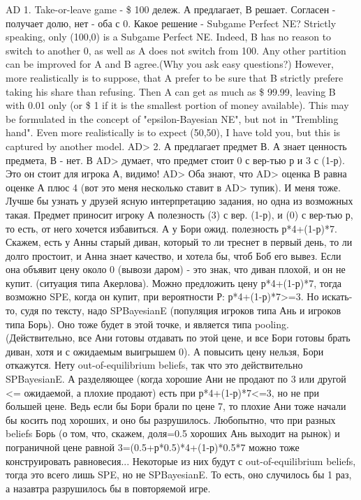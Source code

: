\documentclass[a4paper,12pt]{article}
\begin{document}
AD 1. Take-or-leave game - \$ 100 дележ. А предлагает, В
решает. Согласен -   получает долю, нет - оба с 0. Какое
решение - Subgame Perfect NE? Strictly speaking, only
(100,0) is a Subgame Perfect NE. Indeed, B has no reason to
switch to another 0, as well as A does not switch from 100.
Any other partition can be improved for A and B agree.(Why
you ask easy questions?) However, more realistically is to
suppose, that A prefer to be sure that B strictly prefere
taking his share than refusing. Then A can get as much as
\$ 99.99, leaving B with 0.01 only (or \$ 1 if it is the
smallest portion of money available). This may be
formulated in the concept of "epsilon-Bayesian NE", but not
in "Trembling hand". Even more realistically is to expect
(50,50), I have told you, but this is captured by another
model. AD> 2. А предлагает предмет В. А знает ценность
предмета, В - нет. В AD> думает, что предмет стоит 0 с
вер-тью р и 3 с (1-р). Это он стоит для игрока А, видимо!
AD> Оба знают, что AD> оценка В равна оценке А плюс 4 (вот
это меня несколько ставит в AD> тупик). И меня тоже. Лучше
бы узнать у друзей ясную интерпретацию задания, но одна из
возможных такая. Предмет приносит игроку А полезность (3) с
вер. (1-р),  и (0) с вер-тью р, то есть, от него хочется
избавиться. А у Бори ожид. полезность р*4+(1-р)*7.
 Скажем, есть у Анны старый диван, который то ли треснет в
первый день, то ли долго простоит, и Анна знает качество, и хотела бы,
чтоб Боб его вывез. Если она объявит цену около 0 (вывози даром) - это знак,
что диван плохой, и он не купит. (ситуация типа Акерлова).
Можно предложить цену р*4+(1-р)*7, тогда возможно SPE, когда он купит,
при вероятности Р:  р*4+(1-р)*7>=3.
Но искать-то, судя по тексту, надо SPBayesianE (популяция
игроков типа Ань и игроков типа Борь). Оно тоже будет в
этой точке, и является типа pooling.(Действительно, все Ани готовы
отдавать по этой цене, и все Бори готовы брать диван,
хотя и с ожидаемым выигрышем 0). А повысить цену нельзя, Бори
откажутся. Нету out-of-equilibrium beliefs,
так что это действительно SPBayesianE. А разделяющее (когда
хорошие Ани не продают по 3 или другой <= ожидаемой, а плохие продают)
есть при р*4+(1-р)*7<=3, но не при большей цене. Ведь если бы
Бори брали по цене 7, то плохие Ани тоже начали бы косить под хороших,
и оно бы разрушилось. Любопытно, что при разных beliefs
Борь (о том, что, скажем, доля=0.5 хороших Ань выходит на рынок)
и пограничной цене равной 3=(0.5+р*0.5)*4+(1-р)*0.5*7 можно тоже
конструировать равновесия... Некоторые из них будут с
out-of-equilibrium beliefs, тогда это всего лишь SPE, но не
SPBayesianE. То есть, оно случилось бы 1 раз, а назавтра разрушилось
бы в повторяемой игре.
\end{document}
